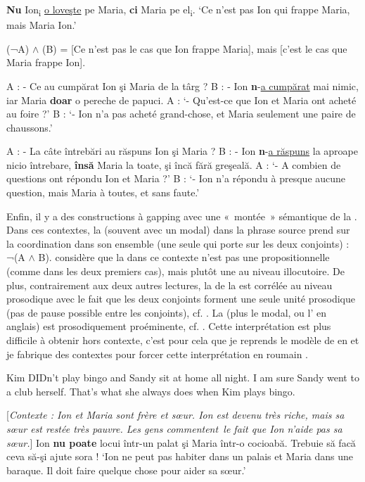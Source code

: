 \ea \label{ch2:ex89}
\ea \textbf{Nu} Ion\textsubscript{i} \uline{o loveşte} pe Maria, \textbf{ci} Maria pe el\textsubscript{i}.
\glt  ‘Ce n’est pas Ion qui frappe Maria, mais Maria Ion.’

\ex (¬A) $\land$ (B) = [Ce n’est pas le cas que Ion frappe Maria], mais [c’est le cas que Maria frappe Ion].
\z
\z

\ea \label{ch2:ex90}
\ea A : - Ce au cumpărat Ion şi Maria de la târg ? B : - Ion \textbf{n}-\uline{a cumpărat} mai nimic, iar Maria \textbf{doar} o pereche de papuci. \label{ch2:ex90a}
\glt A : ‘- Qu’est-ce que Ion et Maria ont acheté au foire ?’ B : ‘- Ion n’a pas acheté grand-chose, et Maria seulement une paire de chaussons.’  

\ex  A : - La câte întrebări au răspuns Ion şi Maria ? B : - Ion \textbf{n}-\uline{a răspuns} la aproape nicio întrebare, \textbf{însă} Maria la toate, şi încă fără greşeală. \label{ch2:ex90b}
\glt A : ‘- A combien de questions ont répondu Ion et Maria ?’ B : ‘- Ion n’a répondu à presque aucune question, mais Maria à toutes, et sans faute.’
\z
\z

Enfin, il y a des constructions à gapping avec une «~montée~» sémantique de la . Dans ces contextes, la  (souvent avec un modal) dans la phrase source prend  sur la coordination dans son ensemble (une seule  qui porte sur les deux conjoints) : ¬(A $\land$ B). \citet{Repp2009} considère que la  dans ce contexte n’est pas une  propositionnelle (comme dans les deux premiers cas), mais plutôt une  au niveau illocutoire. De plus, contrairement aux deux autres lectures, la  de la  est corrélée au niveau prosodique avec le fait que les deux conjoints forment une seule unité prosodique (pas de pause possible entre les conjoints), cf. \citet{Oehrle1987}. La  (plus le modal, ou l’ en anglais) est prosodiquement proéminente, cf. \citet{Winkler2005}. Cette interprétation est plus difficile à obtenir hors contexte, c’est pour cela que je reprends le modèle de \citet{Repp2009} en  et je fabrique des contextes pour forcer cette interprétation en roumain .

\ea \label{ch2:ex91}
Kim DIDn’t play bingo and Sandy sit at home all night. I am sure Sandy went to a club herself. That’s what she always does when Kim plays bingo. \citep[171]{Repp2009}         
\z

\ea {}
[\textit{Contexte : Ion et Maria sont frère et sœur. Ion est devenu très riche, mais sa sœur est restée très pauvre. Les gens commentent~le fait que Ion n’aide pas sa sœur.}] \label{ch2:ex92}
\ea Ion \textbf{nu poate} locui într-un palat şi Maria într-o cocioabă. Trebuie să facă ceva să-şi ajute sora !
\glt ‘Ion ne peut pas habiter dans un palais et Maria dans une baraque. Il doit faire quelque chose pour aider sa sœur.’  

